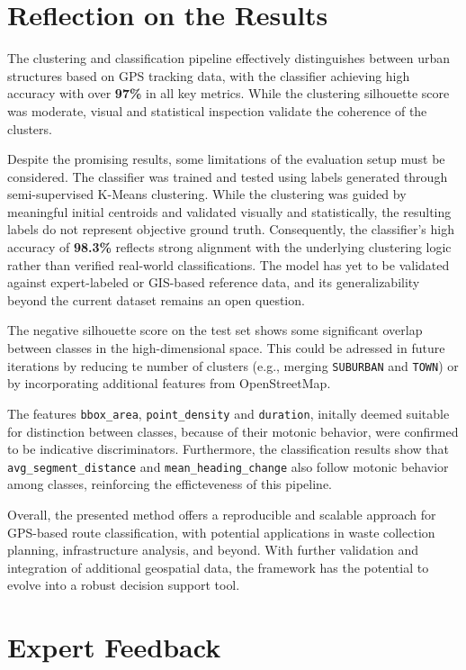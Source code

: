 \documentclass[a4paper,12pt,twoside]{scrreprt}
\begin{document}
\section{Reflection on the Results}

The clustering and classification pipeline effectively distinguishes between
urban structures based on GPS tracking data, with the classifier achieving high
accuracy with over \textbf{97\%} in all
key metrics. While the clustering silhouette score was moderate, visual and
statistical inspection validate the coherence of the clusters.

Despite the promising results, some limitations of the evaluation setup must be
considered. The classifier was trained and tested using labels generated
through semi-supervised K-Means clustering. While the clustering was guided by
meaningful initial centroids and validated visually and statistically, the
resulting labels do not represent objective ground truth. Consequently, the
classifier's high accuracy of \textbf{98.3\%} reflects strong alignment with
the underlying clustering logic rather than verified real-world
classifications. The model has yet to be validated against expert-labeled or
GIS-based reference data, and its generalizability beyond the current dataset
remains an open question.

The negative silhouette score on the test set shows some significant
overlap between classes in the high-dimensional space. This could
be adressed in future iterations by reducing te number of clusters (e.g.,
merging \texttt{SUBURBAN} and \texttt{TOWN}) or by incorporating additional
features from OpenStreetMap.

The features \texttt{bbox\_area}, \texttt{point\_density} and
\texttt{duration},
initally deemed suitable for distinction between classes, because of their
motonic
behavior, were confirmed to be indicative discriminators.
Furthermore, the
classification results show that \texttt{avg\_segment\_distance} and
\texttt{mean\_heading\_change} also follow motonic behavior among classes,
reinforcing the efficteveness of this pipeline.

Overall, the presented method offers a reproducible and scalable approach for
GPS-based
route classification, with potential applications in waste collection
planning, infrastructure analysis, and beyond. With further validation and
integration of additional geospatial data, the framework has the potential to
evolve into a robust decision support tool.

\section{Expert Feedback}
\end{document}
